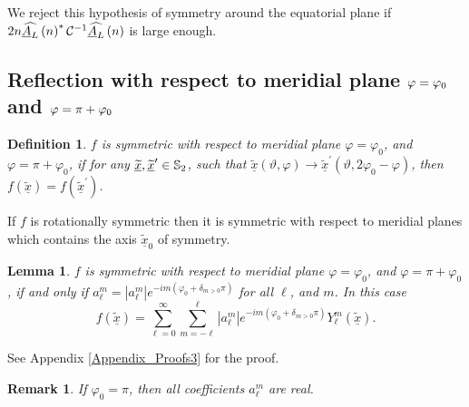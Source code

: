 \documentclass[preprint,11pt,a4paper]{elsarticle}
\newtheorem{definition}[theorem]{Definition}
\newtheorem{lemma}[theorem]{Lemma}
\newtheorem{remark}[theorem]{Remark}
\begin{document}
We reject this hypothesis of symmetry around the equatorial plane if $2n%
\widehat{\underline{A}_{L}}\left( n\right) ^{\ast}\mathcal{C}^{-1}\widehat{%
\underline{A}_{L}}\left( n\right) $ is large enough.

\subsection{Reflection with respect to meridial plane $\protect\varphi=%
\protect\varphi_{0}$ and $\protect\varphi=\protect\pi+\protect\varphi_{0}$}

\begin{definition}
$f$ is symmetric with respect to meridial plane $\varphi=\varphi_{0}$, and $%
\varphi=\pi+\varphi_{0}$, if for any $\underline{\widetilde{x}},\underline{%
\widetilde{x}}^{\prime}\in\mathbb{S}_{2}$, such that $\underline{\widetilde{x%
}}\left( \vartheta,\varphi\right) \rightarrow \underline{\widetilde{x}}%
^{\prime}\left( \vartheta,2\varphi_{0}-\varphi\right) $, then $f\left( 
\underline{\widetilde{x}}\right) =f\left( \underline{\widetilde{x}}%
^{\prime}\right) $.
\end{definition}

If $f$ is rotationally symmetric then it is symmetric with respect to
meridial planes which contains the axis $\underline{\widetilde{x}}_{0}$ of
symmetry.

\begin{lemma}
\label{Lemma_Merid_plane}$f$ is symmetric with respect to meridial plane $%
\varphi=\varphi_{0}$, and $\varphi=\pi+\varphi_{0}$, if and only if $a_{\ell
}^{m}=\left\vert a_{\ell}^{m}\right\vert e^{-im\left(
\varphi_{0}+\delta_{m>0}\pi\right) }$ for all $\ell$, and $m$. In this case 
\begin{equation*}
f\left( \underline{\widetilde{x}}\right)
=\sum_{\ell=0}^{\infty}\sum_{m=-\ell}^{\ell}\left\vert
a_{\ell}^{m}\right\vert e^{-im\left( \varphi_{0}+\delta_{m>0}\pi\right)
}Y_{\ell}^{m}\left( \underline{\widetilde{x}}\right) .
\end{equation*}
\end{lemma}

See Appendix \ref{Appendix_Proofs3} for the proof.

\begin{remark}
If $\varphi_{0}=\pi$, then all coefficients $a_{\ell}^{m}$ are real.
\end{remark}
\end{document}
